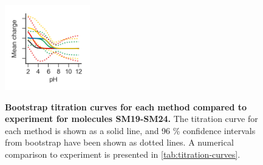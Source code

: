 \documentclass[9pt,lineno,final]{elife}
\begin{document}
\begin{figure}[H]
	\includegraphics[width=0.33\textwidth]{Reports/overview-virtual-titration-SM24.png}	 \\
	\caption{{\bf Bootstrap titration curves for each method compared to experiment for molecules SM19-SM24.} The titration curve for each method is shown as a solid line, and 96 \% confidence intervals from bootstrap have been shown as dotted lines. A numerical comparison to experiment is presented in \cref{tab:titration-curves}.
	\label{fig:charge-curves3}}

\end{figure}
\end{document}
